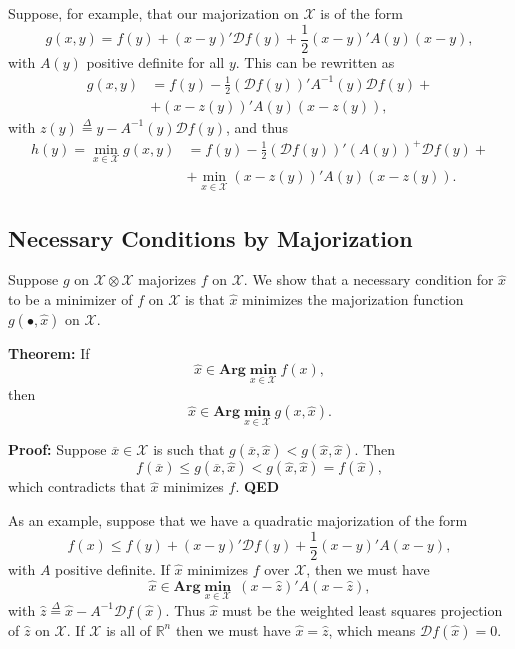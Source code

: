 \documentclass[
  12pt,
]{book}
\begin{document}
Suppose, for example, that our majorization on \(\mathcal{X}\) is of the form
\[
g(x,y)=f(y)+(x-y)'\mathcal{D}f(y)+\frac12(x-y)'A(y)(x-y),
\]
with \(A(y)\) positive definite for all \(y\). This can be rewritten as
\begin{align*}
g(x,y)&=f(y)-\frac12(\mathcal{D}f(y))'A^{-1}(y)\mathcal{D}f(y)+\\
&+(x-z(y))'A(y)(x-z(y)),
\end{align*}
with \(z(y)\mathop{=}\limits^{\Delta}y-A^{-1}(y)\mathcal{D}f(y)\), and thus
\begin{align*}
h(y)=\min_{x\in\mathcal{X}}g(x,y)&=f(y)-\frac12(\mathcal{D}f(y))'(A(y))^+\mathcal{D}f(y)+\\&+\min_{x\in\mathcal{X}}(x-z(y))'A(y)(x-z(y)).
\end{align*}

\hypertarget{necessary-conditions-by-majorization}{%
\subsection{Necessary Conditions by Majorization}\label{necessary-conditions-by-majorization}}

Suppose \(g\) on \(\mathcal{X}\otimes\mathcal{X}\) majorizes \(f\) on \(\mathcal{X}\). We show that a necessary condition for \(\hat x\) to be a minimizer of \(f\) on \(\mathcal{X}\) is that \(\hat x\) minimizes the majorization function \(g(\bullet,\hat x)\) on \(\mathcal{X}\).

\textbf{Theorem:}
If
\[
\hat x\in\mathbf{Arg}\mathop{\mathbf{min}}\limits_{x\in\mathcal{X}}f(x),
\]
then
\[
\hat x\in\mathbf{Arg}\mathop{\mathbf{min}}\limits_{x\in\mathcal{X}}g(x,\hat x).
\]

\textbf{Proof:} Suppose \(\overline x\in\mathcal{X}\) is such that \(g(\overline x,\hat x)<g(\hat x,\hat x).\)
Then
\[
f(\overline x)\leq g(\overline x,\hat x)< g(\hat x,\hat x)=f(\hat x),
\]
which contradicts that \(\hat x\) minimizes \(f\).
\textbf{QED}

As an example, suppose that we have a quadratic majorization of the form
\[
f(x)\leq f(y)+
(x-y)'\mathcal{D}f(y)+\frac12(x-y)'A(x-y),
\]
with \(A\) positive definite.
If \(\hat x\) minimizes \(f\) over \(\mathcal{X}\), then we must have
\[
\hat x\in\mathbf{Arg}\mathop{\mathbf{min}}\limits_{x\in\mathcal{X}}\ (x-\hat z)'A(x-\hat z),
\]
with \(\hat z\mathop{=}\limits^{\Delta}\hat x-A^{-1}\mathcal{D}f(\hat x)\). Thus \(\hat x\) must be the weighted least squares projection of \(\hat z\) on \(\mathcal{X}\). If \(\mathcal{X}\) is all of \(\mathbb{R}^n\)
then we must have \(\hat x=\hat z\), which means \(\mathcal{D}f(\hat x)=0\).
\end{document}
